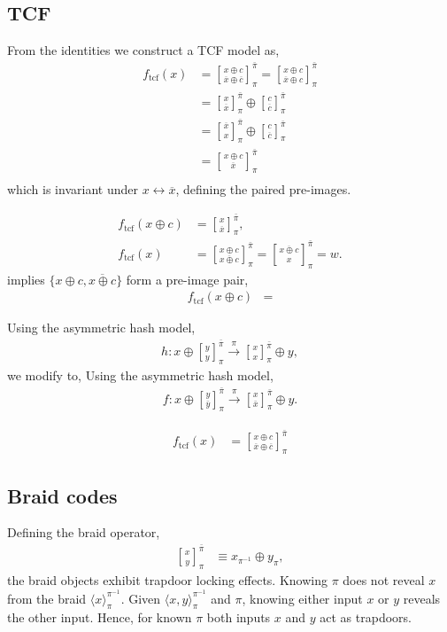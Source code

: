 \documentclass[twocolumn, aps, amsmath, amssymb, nofootinbib, superscriptaddress, longbibliography, doublefloatfix, table-of-contents, eqsecnum, rmp]{revtex4-2}
\def\symbraid#1{\langle#1\rangle_{\pi}^{\pi^{-1}}}
\newcommand{\stackbraid}[2]{{\genfrac{[}{]}{0pt}{}{{#1}}{{#2}}}^{\bar{\pi}}_{\pi}}
\begin{document}
\subsection{TCF}

From the identities we construct a TCF model as,
\begin{align}
	f_\mathrm{tcf}(x) &= \stackbraid{x\oplus c}{\overline{x}\oplus \overline{c}} = \stackbraid{x\oplus c}{\overline{x}\oplus c}\nonumber\\
	&= \stackbraid{x}{\overline{x}} \oplus \stackbraid{c}{\overline{c}}\nonumber\\
	&= \stackbraid{\overline{x}}{x} \oplus \stackbraid{c}{\overline{c}}\nonumber\\
	&= \stackbraid{x\oplus c}{\overline{x}} \nonumber\\
\end{align}
which is invariant under $x\leftrightarrow \overline{x}$, defining the paired pre-images.

\begin{align}
	f_\mathrm{tcf}(x\oplus c) &= \stackbraid{x}{\overline{x}}, \nonumber\\
	f_\mathrm{tcf}(x) &= \stackbraid{x\oplus c}{\overline{x\oplus c}} = \stackbraid{\overline{x\oplus c}}{x} = w.
\end{align}
implies $\{x\oplus c, \overline{x\oplus c}\}$ form a pre-image pair,
\begin{align}
	f_\mathrm{tcf}(x\oplus c) &= 
\end{align}

Using the asymmetric hash model,
\begin{align}
	h: x\oplus \stackbraid{y}{y} \xrightarrow{\pi} \stackbraid{x}{x} \oplus y,
\end{align}
we modify to,
Using the asymmetric hash model,
\begin{align}
	f: x\oplus \stackbraid{y}{\bar{y}} \xrightarrow{\pi} \stackbraid{x}{\bar{x}} \oplus y.
\end{align}

\begin{align}
	f_\mathrm{tcf}(x) &= \stackbraid{x\oplus c}{\overline{x}\oplus \overline{c}}
\end{align}

\subsection{Braid codes}

Defining the braid operator,
\begin{align}
	\stackbraid{x}{y} &\equiv x_{\pi^{-1}} \oplus y_{\pi},
\end{align}
the braid objects exhibit trapdoor locking effects. Knowing $\pi$ does not reveal $x$ from the braid $\symbraid{x}$. Given $\symbraid{x,y}$ and $\pi$, knowing either input $x$ or $y$ reveals the other input. Hence, for known $\pi$ both inputs $x$ and $y$ act as trapdoors.
\end{document}
